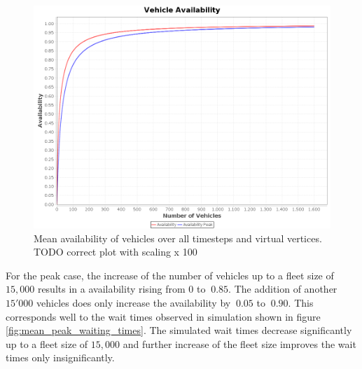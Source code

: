 \begin{figure}[h]
\begin{center}\includegraphics[width=1.0\textwidth]{figures/availbilitiesByNumberVehicles.png}\end{center}
\caption{Mean availability of vehicles over all timesteps and virtual vertices.  TODO correct plot with scaling x 100}
\label{fig:performanceavailability}
\end{figure}

For the peak case, the increase of the number of vehicles up to a fleet size of $15,000$ results
in a availability rising from $0$ to $~0.85$. The addition of another $15'000$ vehicles does only increase the availability by $~0.05$ to $~0.90$. This corresponds well to the wait times observed in simulation shown in figure \ref{fig:mean_peak_waiting_times}. The simulated wait times decrease significantly up to a fleet size of $15,000$ and further increase of the fleet size improves the wait times only insignificantly. 